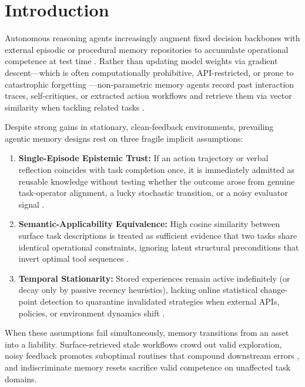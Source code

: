 \documentclass[10pt,letterpaper]{article}
\begin{document}
\section{Introduction}
Autonomous reasoning agents increasingly augment fixed decision backbones with external episodic or procedural memory repositories to accumulate operational competence at test time \cite{yao2023react,shinn2023reflexion,wang2024voyager,zhao2024expel,wang2025awm}. Rather than updating model weights via gradient descent—which is often computationally prohibitive, API-restricted, or prone to catastrophic forgetting \cite{kirkpatrick2017overcoming}—non-parametric memory agents record past interaction traces, self-critiques, or extracted action workflows and retrieve them via vector similarity when tackling related tasks \cite{park2023generative,liu2025cer,ouyang2026reasoningbank}.

Despite strong gains in stationary, clean-feedback environments, prevailing agentic memory designs rest on three fragile implicit assumptions:
\begin{enumerate}
  \item \textbf{Single-Episode Epistemic Trust:} If an action trajectory or verbal reflection coincides with task completion once, it is immediately admitted as reusable knowledge without testing whether the outcome arose from genuine task-operator alignment, a lucky stochastic transition, or a noisy evaluator signal \cite{xiong2024can,xiong2026memory}.
  \item \textbf{Semantic-Applicability Equivalence:} High cosine similarity between surface task descriptions is treated as sufficient evidence that two tasks share identical operational constraints, ignoring latent structural preconditions that invert optimal tool sequences \cite{chen2024agentpoison,zou2025poisonedrag}.
  \item \textbf{Temporal Stationarity:} Stored experiences remain active indefinitely (or decay only by passive recency heuristics), lacking online statistical change-point detection to quarantine invalidated strategies when external APIs, policies, or environment dynamics shift \cite{gama2014survey}.
\end{enumerate}

When these assumptions fail simultaneously, memory transitions from an asset into a liability. Surface-retrieved stale workflows crowd out valid exploration, noisy feedback promotes suboptimal routines that compound downstream errors \cite{xiong2026memory}, and indiscriminate memory resets sacrifice valid competence on unaffected task domains.
\end{document}
